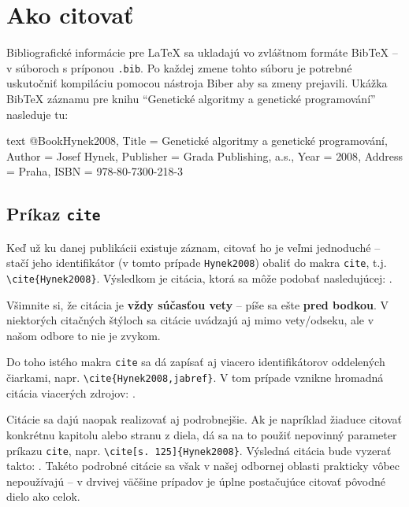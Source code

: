 \chapter{Ako citovať}

Bibliografické informácie pre LaTeX sa ukladajú vo zvláštnom formáte BibTeX -- v súboroch s príponou \texttt{.bib}. Po každej zmene tohto súboru je potrebné uskutočniť kompiláciu pomocou nástroja Biber aby sa zmeny prejavili. Ukážka BibTeX záznamu pre knihu \enquote{Genetické algoritmy a genetické programování} nasleduje tu:

\begin{inlinecode}{text}
@Book{Hynek2008,
  Title                    = {Genetické algoritmy a genetické programování},
  Author                   = {Josef Hynek},
  Publisher                = {Grada Publishing, a.s.},
  Year                     = {2008},
  Address                  = {Praha},
  ISBN                     = {978-80-7300-218-3}
}
\end{inlinecode}

\section{Príkaz \texttt{cite}}

Keď už ku danej publikácii existuje záznam, citovať ho je veľmi jednoduché -- stačí jeho identifikátor (v tomto prípade \texttt{Hynek2008}) obaliť do makra \texttt{cite}, t.j. \texttt{{\textbackslash}cite\{Hynek2008\}}. Výsledkom je citácia, ktorá sa môže podobať nasledujúcej: \cite{Hynek2008}.

Všimnite si, že citácia je \textbf{vždy súčasťou vety} -- píše sa ešte \textbf{pred bodkou}. V niektorých citačných štýloch sa citácie uvádzajú aj mimo vety/odseku, ale v našom odbore to nie je zvykom.

Do toho istého makra \texttt{cite} sa dá zapísať aj viacero identifikátorov oddelených čiarkami, napr. \texttt{{\textbackslash}cite\{Hynek2008,jabref\}}. V tom prípade vznikne hromadná citácia viacerých zdrojov: \cite{Hynek2008,jabref}.

Citácie sa dajú naopak realizovať aj podrobnejšie. Ak je napríklad žiaduce citovať konkrétnu kapitolu alebo stranu z diela, dá sa na to použiť nepovinný parameter príkazu \texttt{cite}, napr. \texttt{{\textbackslash}cite[s. 125]\{Hynek2008\}}. Výsledná citácia bude vyzerať takto: \cite[s. 125]{Hynek2008}. Takéto podrobné citácie sa však v našej odbornej oblasti prakticky vôbec nepoužívajú -- v drvivej väčšine prípadov je úplne postačujúce citovať pôvodné dielo ako celok.

